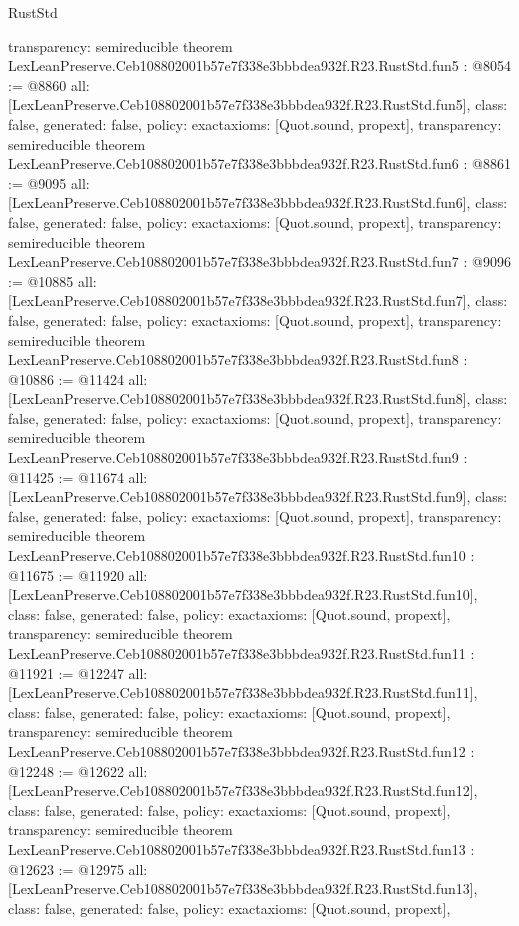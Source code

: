 \begin{lexlean}{RustStd}
\begin{coremodule}
{  transparency: semireducible
}
theorem LexLeanPreserve.Ceb108802001b57e7f338e3bbbdea932f.R23.RustStd.fun5 : @8054 := @8860 {
  all: [LexLeanPreserve.Ceb108802001b57e7f338e3bbbdea932f.R23.RustStd.fun5],
  class: false,
  generated: false,
  policy: exact{axioms: [Quot.sound, propext]},
  transparency: semireducible
}
theorem LexLeanPreserve.Ceb108802001b57e7f338e3bbbdea932f.R23.RustStd.fun6 : @8861 := @9095 {
  all: [LexLeanPreserve.Ceb108802001b57e7f338e3bbbdea932f.R23.RustStd.fun6],
  class: false,
  generated: false,
  policy: exact{axioms: [Quot.sound, propext]},
  transparency: semireducible
}
theorem LexLeanPreserve.Ceb108802001b57e7f338e3bbbdea932f.R23.RustStd.fun7 : @9096 := @10885 {
  all: [LexLeanPreserve.Ceb108802001b57e7f338e3bbbdea932f.R23.RustStd.fun7],
  class: false,
  generated: false,
  policy: exact{axioms: [Quot.sound, propext]},
  transparency: semireducible
}
theorem LexLeanPreserve.Ceb108802001b57e7f338e3bbbdea932f.R23.RustStd.fun8 : @10886 := @11424 {
  all: [LexLeanPreserve.Ceb108802001b57e7f338e3bbbdea932f.R23.RustStd.fun8],
  class: false,
  generated: false,
  policy: exact{axioms: [Quot.sound, propext]},
  transparency: semireducible
}
theorem LexLeanPreserve.Ceb108802001b57e7f338e3bbbdea932f.R23.RustStd.fun9 : @11425 := @11674 {
  all: [LexLeanPreserve.Ceb108802001b57e7f338e3bbbdea932f.R23.RustStd.fun9],
  class: false,
  generated: false,
  policy: exact{axioms: [Quot.sound, propext]},
  transparency: semireducible
}
theorem LexLeanPreserve.Ceb108802001b57e7f338e3bbbdea932f.R23.RustStd.fun10 : @11675 := @11920 {
  all: [LexLeanPreserve.Ceb108802001b57e7f338e3bbbdea932f.R23.RustStd.fun10],
  class: false,
  generated: false,
  policy: exact{axioms: [Quot.sound, propext]},
  transparency: semireducible
}
theorem LexLeanPreserve.Ceb108802001b57e7f338e3bbbdea932f.R23.RustStd.fun11 : @11921 := @12247 {
  all: [LexLeanPreserve.Ceb108802001b57e7f338e3bbbdea932f.R23.RustStd.fun11],
  class: false,
  generated: false,
  policy: exact{axioms: [Quot.sound, propext]},
  transparency: semireducible
}
theorem LexLeanPreserve.Ceb108802001b57e7f338e3bbbdea932f.R23.RustStd.fun12 : @12248 := @12622 {
  all: [LexLeanPreserve.Ceb108802001b57e7f338e3bbbdea932f.R23.RustStd.fun12],
  class: false,
  generated: false,
  policy: exact{axioms: [Quot.sound, propext]},
  transparency: semireducible
}
theorem LexLeanPreserve.Ceb108802001b57e7f338e3bbbdea932f.R23.RustStd.fun13 : @12623 := @12975 {
  all: [LexLeanPreserve.Ceb108802001b57e7f338e3bbbdea932f.R23.RustStd.fun13],
  class: false,
  generated: false,
  policy: exact{axioms: [Quot.sound, propext]},
}
\end{coremodule}
\end{lexlean}
